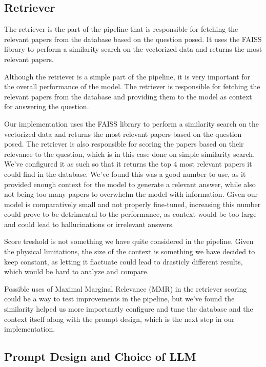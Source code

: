 \documentclass[fleqn,moreauthors,10pt]{ds_report}
\begin{document}
\subsection*{Retriever}
The retriever is the part of the pipeline that is responsible for fetching the relevant papers from the database based on the question posed. It uses the FAISS library to perform a similarity search on the vectorized data and returns the most relevant papers.

Although the retriever is a simple part of the pipeline, it is very important for the overall performance of the model. The retriever is responsible for fetching the relevant papers from the database and providing them to the model as context for answering the question.

Our implementation uses the FAISS library to perform a similarity search on the vectorized data and returns the most relevant papers based on the question posed. The retriever is also responsible for scoring the papers based on their relevance to the question, which is in this case done on simple similarity search. We've configured it as such so that it returns the top 4 most relevant papers it could find in the database. We've found this was a good number to use, as it provided enough context for the model to generate a relevant answer, while also not being too many papers to overwhelm the model with information. Given our model is comparatively small and not properly fine-tuned, increasing this number could prove to be detrimental to the performance, as context would be too large and could lead to hallucinations or irrelevant answers.

Score treshold is not something we have quite considered in the pipeline. Given the physical limitations, the size of the context is something we have decided to keep constant, as letting it flactuate could lead to drasticly different results, which would be hard to analyze and compare.

Possible uses of Maximal Marginal Relevance (MMR) in the retriever scoring could be a way to test improvements in the pipeline, but we've found the similarity helped us more importantly configure and tune the database and the context itself along with the prompt design, which is the next step in our implementation.

\subsection*{Prompt Design and Choice of LLM}
\end{document}
